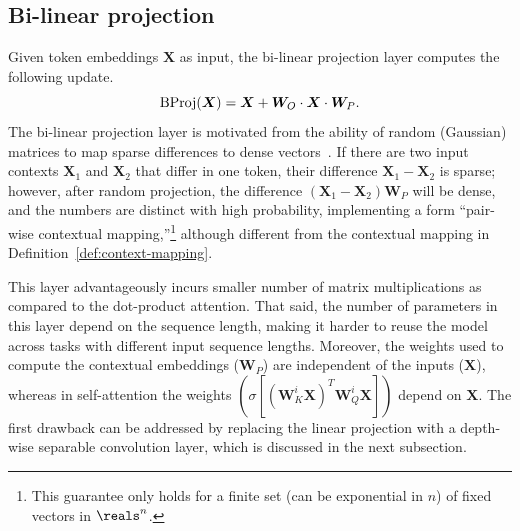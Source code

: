 \documentclass{article} %
\def\mW{{\bm{W}}}
\def\mX{{\bm{X}}}
\newcommand{\sfmx}{\sigma}
\begin{document}
\subsection{Bi-linear projection}
\vspace*{-3pt}
\label{sec:bi-linear}
Given token embeddings $\mX$ as input, the bi-linear projection layer computes the following update.
\begin{equation*}
    {\rm BProj}(\mX) = \mX + \mW_O \cdot \mX \cdot \mW_P.
\end{equation*}
The bi-linear projection layer \citep{gong2013learning} is motivated from the ability of random (Gaussian) matrices to map sparse differences to dense vectors~\citep{ailon2009fast}. If there are two input contexts $\mX_1$ and $\mX_2$ that differ in one token, their difference $\mX_1-\mX_2$ is sparse; however, after random projection, the difference $(\mX_1-\mX_2)\mW_P$ will be dense, and the numbers are distinct with high probability, implementing a form ``pair-wise contextual mapping,''\footnote{This guarantee only holds for a finite set (can be exponential in $n$) of fixed vectors in $\reals^n$.} although different from the contextual mapping in Definition~\ref{def:context-mapping}.


This layer advantageously incurs smaller number of matrix multiplications as compared to the dot-product attention. That said, the number of parameters in this layer depend on the sequence length, making it harder to reuse the model across tasks with different input sequence lengths. Moreover, the weights used to compute the contextual embeddings ($\mW_P$) are independent of the inputs ($\mX$), whereas in self-attention the weights $(\sfmx [(\mW_K^i \mX)^T \mW_Q^i \mX])$ depend on $\mX$. The first drawback can be addressed by replacing the linear projection with a depth-wise separable convolution layer, which is discussed in the next subsection.

\vspace*{-2pt}
\end{document}
